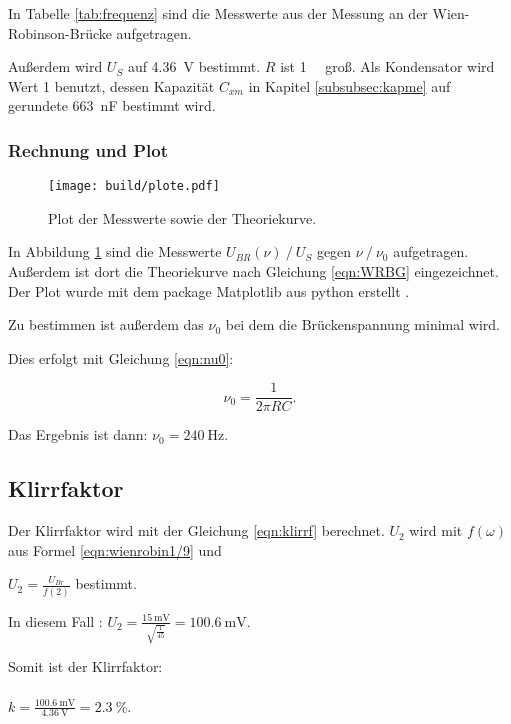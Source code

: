In Tabelle \ref{tab:frequenz} sind die Messwerte aus der Messung an der
Wien-Robinson-Brücke aufgetragen.

Außerdem wird $U_S$ auf \SI{4.36}{\volt} bestimmt. $R$ ist \SI{1}{\kilo\Omega}
groß. Als Kondensator wird Wert 1 benutzt, dessen Kapazität $C_{xm}$ in Kapitel
\ref{subsubsec:kapme} auf gerundete \SI{663}{\nano\farad} bestimmt wird.

\FloatBarrier

\subsubsection{Rechnung und Plot}

\begin{figure}[h]
  \centering
  \texttt{[image: build/plote.pdf]}
  \caption{Plot der Messwerte sowie der Theoriekurve.}
  \label{fig:WRBplot}
\end{figure}

In Abbildung \ref{fig:WRBplot} sind die Messwerte $U_{BR}(\nu) \ /\ U_S$ gegen
$\nu \ /\ \nu_0$ aufgetragen. Außerdem ist dort die Theoriekurve nach Gleichung
\eqref{eqn:WRBG} eingezeichnet. Der Plot wurde mit dem package Matplotlib aus
python erstellt \cite{matplotlib}.

Zu bestimmen ist außerdem das $\nu_0$ bei dem die Brückenspannung minimal wird.

Dies erfolgt mit Gleichung \eqref{eqn:nu0}:

\begin{equation}
  \nu_0 = \frac{1}{2 \pi R C}.
  \label{eqn:nu0}
\end{equation}

Das Ergebnis ist dann: $\nu_0 = \SI{240}{\hertz}$.

\subsection{Klirrfaktor}

Der Klirrfaktor wird mit der Gleichung \eqref{eqn:klirrf} berechnet.
$U_2$ wird mit $f(\omega)$ aus Formel \eqref{eqn:wienrobin1/9} und

$U_2 = \frac{U_{Br}}{f(2)}$ bestimmt.

In diesem Fall : $U_2 = \frac{\SI{15}{\milli\volt}}{\sqrt{\frac{1}{45}}} =
\SI{100.6}{\milli\volt}$.

Somit ist der Klirrfaktor:\\
\\$k = \frac{\SI{100.6}{\milli\volt}}{\SI{4.36}{\volt}} = \SI{2.3}{\percent}$.
